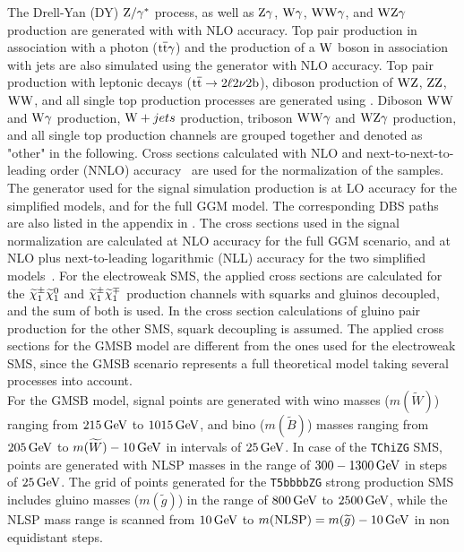 The Drell-Yan (DY) $\mathrm{Z}/\gamma^{*}$ process, as well as $\mathrm{Z}\gamma$, $\mathrm{W}\gamma$, $\mathrm{W}\mathrm{W}\gamma$, and $\mathrm{W}\mathrm{Z}\gamma$ production are generated with \MGvATNLO with NLO accuracy. Top pair production in association with a photon (${\mathrm{t}\overline{\mathrm{t}}}\gamma$) and the production of a $\mathrm{W}$ boson in association with jets are also simulated using the \MGvATNLO generator with NLO accuracy. Top pair production with leptonic decays (${\mathrm{t}\overline{\mathrm{t}}}\to 2\ell 2\nu 2\mathrm{b}$), diboson production of $\mathrm{W}\mathrm{Z}$, $\mathrm{Z}\mathrm{Z}$, $\mathrm{W}\mathrm{W}$, and all single top production processes are generated using \POWHEG.
Diboson $\mathrm{W}\mathrm{W}$ and $\mathrm{W}\gamma$ production, $\mathrm{W}+jets$ production, triboson $\mathrm{W}\mathrm{W}\gamma$ and $\mathrm{W}\mathrm{Z}\gamma$ production, and all single top production channels are grouped together and denoted as "other" in the following.
Cross sections calculated with NLO and next-to-next-to-leading order (NNLO) accuracy~\cite{xsec1,xsec2,xsec3,xsec4,xsec5,xsec6,xsec7,xsec8,xsec9} are used for the normalization of the samples.\\
The generator used for the signal simulation production is \MGvATNLO at LO accuracy for the simplified models, and  for the full GGM model. The corresponding DBS paths are also listed in the appendix in .
The cross sections used in the signal normalization are calculated at NLO accuracy for the full GGM scenario, and at NLO plus next-to-leading logarithmic (NLL) accuracy for the two simplified models~\cite{sxsec1,sxsec2,sxsec3,sxsec4,sxsec5,sxsec6,sxsec7,sxsec8,sxsec9}.
For the electroweak SMS, the applied cross sections are calculated for the $\widetilde{\chi}^\pm_{1}\widetilde{\chi}^{0}_{1}$ and $\widetilde{\chi}^\pm_{1}\widetilde{\chi}^\mp_{1}$ production channels with squarks and gluinos decoupled, and the sum of both is used. In the cross section calculations of gluino pair production for the other SMS, squark decoupling is assumed. The applied cross sections for the GMSB model are different from the ones used for the electroweak SMS, since the GMSB scenario represents a full theoretical model taking several processes into account.\\
For the GMSB model, signal points are generated with wino masses ($m(\widetilde{W})$) ranging from $215\,\text{Ge\hspace{-.08em}V}$ to $1015\,\text{Ge\hspace{-.08em}V}$, and bino ($m(\widetilde{B})$) masses ranging from $205\,\text{Ge\hspace{-.08em}V}$ to $m(\widetilde{W})-10\,\text{Ge\hspace{-.08em}V}$ in intervals of $25\,\text{Ge\hspace{-.08em}V}$.
In case of the \texttt{TChiZG} SMS, points are generated with NLSP masses in the range of $300-1300\,\text{Ge\hspace{-.08em}V}$ in steps of $25\,\text{Ge\hspace{-.08em}V}$. The grid of points generated for the \texttt{T5bbbbZG} strong production SMS includes gluino masses ($m(\widetilde{g})$) in the range of $800\,\text{Ge\hspace{-.08em}V}$ to $2500\,\text{Ge\hspace{-.08em}V}$, while the NLSP mass range is scanned from $10\,\text{Ge\hspace{-.08em}V}$ to $m(\mathrm{NLSP})=m(\widetilde{g})-10\,\text{Ge\hspace{-.08em}V}$ in non equidistant steps.\\
